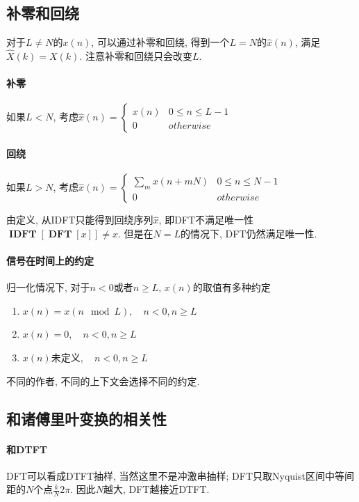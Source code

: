 \documentclass{ctexart}
\DeclareMathOperator{\DFT}{\mathbf{DFT}}
\DeclareMathOperator{\IDFT}{\mathbf{IDFT}}
\begin{document}
\subsection{补零和回绕} 对于$L \neq N$的$x(n)$, 可以通过补零和回绕, 得到一个$L = N$的$\hat{x}(n)$, 满足$\hat{X}(k) = X(k)$.
    注意补零和回绕只会改变$L$.
\paragraph{补零} 如果$L < N$, 考虑$\hat{x}(n) = \begin{cases} x(n) & 0 \le n \le L - 1\\ 0 & otherwise \end{cases}$
\paragraph{回绕} 如果$L > N$, 考虑$\hat{x}(n) = \begin{cases} \sum_m x(n + mN) & 0 \le n \le N - 1 \\ 0 & otherwise \end{cases}$\par
    由定义, 从IDFT只能得到回绕序列$\hat{x}$, 即DFT不满足唯一性 $\IDFT[\DFT [x]] \neq x$. 但是在$N = L$的情况下, DFT仍然满足唯一性.
\paragraph{信号在时间上的约定}
    归一化情况下, 对于$n < 0$或者$n \ge L$, $x(n)$的取值有多种约定 \begin{enumerate}
        \item $x(n) = x(n \mod L),\quad n < 0, n \ge L$
        \item $x(n) = 0,\quad n < 0, n \ge L$
        \item $x(n)$未定义$,\quad n < 0, n \ge L$
    \end{enumerate}
    不同的作者, 不同的上下文会选择不同的约定.

\subsection{和诸傅里叶变换的相关性}
\paragraph{和DTFT} DFT可以看成DTFT抽样, 当然这里不是冲激串抽样;
    DFT只取Nyquist区间中等间距的$N$个点$\frac{k}{N}2\pi$.
    因此$N$越大, DFT越接近DTFT.
\end{document}
